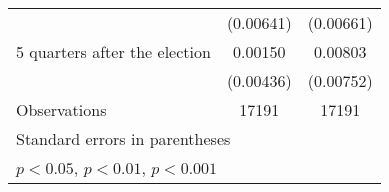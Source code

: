 \begin{table}[htbp]
\begin{tabular}{l*{2}{c}}
                    &   (0.00641)         &   (0.00661)         \\
[1em]
 5 quarters after the election&     0.00150         &     0.00803         \\
                    &   (0.00436)         &   (0.00752)         \\
\hline
Observations        &       17191         &       17191         \\
\hline\hline
\multicolumn{3}{l}{\footnotesize Standard errors in parentheses}\\
\multicolumn{3}{l}{\footnotesize \sym{*} \(p<0.05\), \sym{**} \(p<0.01\), \sym{***} \(p<0.001\)}\\
\end{tabular}
\end{table}
